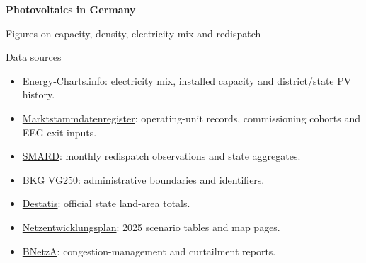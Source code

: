 \documentclass[aspectratio=169,11pt]{beamer}
\begin{document}
\begin{frame}[plain]
\centering
\vfill
{\Huge\bfseries Photovoltaics in Germany\par}
\vspace{0.35cm}
{\Large Figures on capacity, density, electricity mix and redispatch\par}
\vfill
\end{frame}

\begin{frame}{Data sources}
\scriptsize
\begin{itemize}
\item \href{https://energy-charts.info/}{Energy-Charts.info}: electricity mix, installed capacity and district/state PV history.
\item \href{https://www.marktstammdatenregister.de/MaStR/}{Marktstammdatenregister}: operating-unit records, commissioning cohorts and EEG-exit inputs.
\item \href{https://www.smard.de/}{SMARD}: monthly redispatch observations and state aggregates.
\item \href{https://gdz.bkg.bund.de/index.php/default/digitale-geodaten/verwaltungsgebiete/verwaltungsgebiete-1-250-000-stand-31-12-vg250-31-12.html}{BKG VG250}: administrative boundaries and identifiers.
\item \href{https://www.destatis.de/DE/Themen/Branchen-Unternehmen/Landwirtschaft-Forstwirtschaft-Fischerei/Flaechennutzung/Tabellen/bodenflaeche-laender.html}{Destatis}: official state land-area totals.
\item \href{https://www.netzentwicklungsplan.de/}{Netzentwicklungsplan}: 2025 scenario tables and map pages.
\item \href{https://www.bundesnetzagentur.de/DE/Fachthemen/ElektrizitaetundGas/Versorgungssicherheit/Engpassmanagement/start.html}{BNetzA}: congestion-management and curtailment reports.
\end{itemize}
\end{frame}
\end{document}
